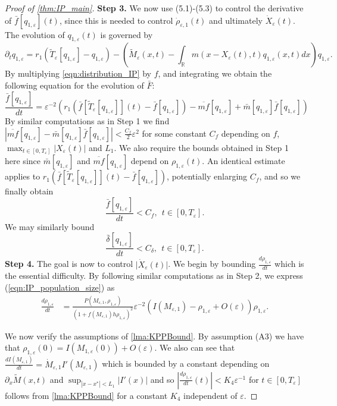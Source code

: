 \documentclass[]{article}
\theoremstyle{remark}
\begin{document}
\begin{proof}[{Proof of \cref{thm:IP_main}}]
\textbf{Step 3.} We now use (5.1)-(5.3) to control the derivative of $\bar{f}[q_{1,\varepsilon}](t)$, since this is  needed to control  $\dot{\rho}_{\varepsilon,1}(t)$ and ultimately $\dot{X}_\varepsilon(t)$.
The evolution of $q_{1,\varepsilon}(t)$ is governed by 
\begin{equation}\label{eqn:distribution_IP}
\partial_{t}q_{1,\varepsilon}= r_1 \left(\widetilde T_{\varepsilon}[q_{1,\varepsilon}] - q_{1,\varepsilon} \right) 
-  \left( \widetilde{M}_{\varepsilon}(x,t)  - \int_{\mathbb R} m(x-X_\varepsilon(t),t)q_{1,\varepsilon}(x,t) dx \right) q_{1,\varepsilon}.
\end{equation}
By multiplying \eqref{eqn:distribution_IP} by $f$, and integrating we obtain the following equation for the evolution of $\bar{F}$:
\begin{equation}\label{eqn:barf_evo}
\frac{\bar{f}[q_{1,\varepsilon}]}{dt}=\varepsilon^{-2}\left(r_1(\bar{f}[\tilde{T}_{\varepsilon}[q_{1,\varepsilon}]](t)-\bar{f}[q_{1,\varepsilon}])-\overline{mf}[q_{1,\varepsilon}]+\bar{m}[q_{1,\varepsilon}]\bar{f}[q_{1,\varepsilon}]\right) 
\end{equation}
By similar computations as in Step 1 we find  $|\overline{mf}[q_{1,\varepsilon}]-\bar{m}[q_{1,\varepsilon}]\bar{f}[q_{1,\varepsilon}]|<\frac{C_{f}}{2}\varepsilon^2$ for some constant $C_f$ depending on $f$, $\max_{t\in[0,T_\varepsilon]}|{X}_\varepsilon(t)|$ and $L_1$. We also require the bounds obtained in Step 1 here since $\bar{m}[q_{1,\varepsilon}]$ and $\overline{mf}[q_{1,\varepsilon}]$ depend on $\rho_{1,\varepsilon}(t)$. An identical estimate applies to $r_1(\bar{f}[\tilde{T}_{\varepsilon}[q_{1,\varepsilon}]](t)-\bar{f}[q_{1,\varepsilon}])$, potentially enlarging $C_{f}$, and so we finally obtain 
\[\frac{\bar{f}[q_{1,\varepsilon}]}{dt}<C_f,~~t\in[0,T_\varepsilon].\]
We may similarly bound 
\[\frac{\bar{\delta}[q_{1,\varepsilon}]}{dt}<C_\delta,~~t\in[0,T_\varepsilon].\]
\textbf{Step 4.} The goal is now to control $\vert{\dot{X}_\varepsilon(t)}|$. We begin by bounding $\frac{d\rho_{1,\varepsilon}}{dt}$ which is the essential difficulty.
By following similar computations as in Step 2, we express (\ref{eqn:IP_population_size}) as
\begin{align*}
\frac{d\rho_{1,\varepsilon}}{dt}&=\frac{P(M_{\varepsilon,1},\rho_{1,\varepsilon})}{(1+f(M_{\varepsilon,1})h\rho_{1,\varepsilon})^2}\varepsilon^{-2}(I(M_{\varepsilon,1})-\rho_{1,\varepsilon}+O(\varepsilon))\rho_{1,\varepsilon}.
\end{align*}

We now verify the assumptions of \cref{lma:KPPBound}. By assumption (A3) we have that ${\rho}_{1,\varepsilon}(0)=I(M_{1,\varepsilon}(0))+O(\varepsilon)$. We also can see that  $\frac{dI(M_{\varepsilon,1})}{dt}=\dot{M}_{\varepsilon,1}I'(M_{\varepsilon,1})$ which is bounded by a constant depending on $\partial_{x}\widetilde{M}(x,t)$ and $\sup_{|x-x^{*}|<L_1}|I'(x)|$ and so $\left|\frac{d\rho_{1,\varepsilon}}{dt}(t)\right|<K_4\varepsilon^{-1}$ for $t\in[0,T_\varepsilon]$ follows from \cref{lma:KPPBound} for a constant $K_4$ independent of $\varepsilon$. 



\end{proof}
\end{document}
